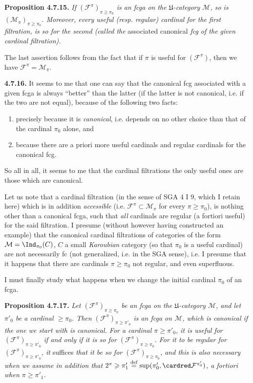 \textbf{Proposition 4.7.15.} \textit{If $(\mathcal{F}^{\pi})_{\pi\geqslant\pi_0}$ is an fcga on the $\mathfrak{U}$-category $\mathcal{M}$, so is $(\mathcal{M}_\pi)_{\pi\geqslant\pi_0}$. Moreover, every useful (resp. regular) cardinal for the first filtration, is so for the second (called the} associated canonical \textit{fcg of the given} \textit{cardinal filtration).}

The last assertion follows from the fact that if $\pi$ is useful for $(\mathcal{F}^{\pi})$, then we have $\mathcal{F}^{\pi}=\mathcal{M}_\pi$.

\textbf{4.7.16.} It seems to me that one can say that the canonical fcg associated with a given fcga
is always ``better'' than the latter (if the latter is not canonical, i.e. if the two are not equal), because of the following two facts:
\begin{enumerate}[label=\alph*)]
\item precisely because it is \textit{canonical}, i.e. depends on no other choice than that of the cardinal $\pi_0$ alone, and
\item because there are a priori more useful cardinals and regular cardinals for the canonical fcg.
\end{enumerate}
So all in all, it seems to me that the cardinal filtrations the only useful ones are those which are canonical.

\noindent{}
Let us note that a cardinal filtration (in the sense of SGA 4 I 9, which I retain here) which is in addition \textit{accessible} (i.e. $\mathcal{F}^{\pi}\subset\mathcal{M}_\pi$ for every $\pi\geqslant\pi_0$), is nothing other than a canonical fcga, such that \textit{all} cardinals are regular (a fortiori useful) for the said filtration. I presume (without however having constructed an example) that the canonical cardinal filtrations of categories of the form $\mathcal{M}=\Ind_{\pi_0}(C)$, $C$ a small \textit{Karoubian} category (so that $\pi_0$ is a useful cardinal) are not necessarily fc (not generalized, i.e. in the SGA sense), i.e. I presume that it happens that there are cardinals $\pi\geqslant\pi_0$ not regular, and even superfluous.

\noindent{}I must finally study what happens when we change the initial cardinal $\pi_0$ of an fcga.

\textbf{Proposition 4.7.17.} \textit{Let $(\mathcal{F}^{\pi})_{\pi\geqslant\pi_0}$ be an fcga on the $\mathfrak{U}$-category $\mathcal{M}$, and let $\pi'_0$ be a cardinal $\geqslant\pi_0$. Then $(\mathcal{F}^{\pi})_{\pi\geqslant\pi'_0}$ is an fcga on $\mathcal{M}$, which is canonical if the one we start with is canonical. For a cardinal $\pi\geqslant\pi'_0$, it is useful for $(\mathcal{F}^{\pi})_{\pi\geqslant\pi'_0}$ if and only if it is so for $(\mathcal{F}^{\pi})_{\pi\geqslant\pi_0}$. For it to be regular for $(\mathcal{F}^{\pi})_{\pi\geqslant\pi'_0}$, it} suffices \textit{that it be so for $(\mathcal{F}^{\pi})_{\pi\geqslant\pi_0}$, and this is also necessary when we assume in addition that $2^{\pi}\geqslant\pi'_1\overset{\text{def}}{=}\sup(\pi'_0,\cardred\mathcal{F}^{\pi'_0})$, a fortiori when $\pi\geqslant\pi'_1$.}

